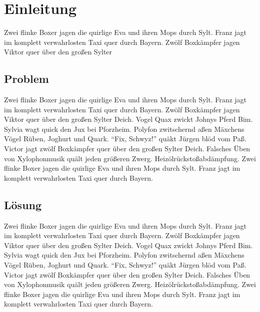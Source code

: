 \section{Einleitung}
Zwei flinke Boxer jagen die quirlige Eva und ihren Mops durch Sylt. Franz jagt im komplett verwahrlosten Taxi quer durch Bayern. Zwölf Boxkämpfer jagen Viktor quer über den großen Sylter

\subsection{Problem}
Zwei flinke Boxer jagen die quirlige Eva und ihren Mops durch Sylt. Franz jagt im komplett verwahrlosten Taxi quer durch Bayern. Zwölf Boxkämpfer jagen Viktor quer über den großen Sylter Deich. Vogel Quax zwickt Johnys Pferd Bim.\\
Sylvia wagt quick den Jux bei Pforzheim. Polyfon zwitschernd aßen Mäxchens Vögel Rüben, Joghurt und Quark. "`Fix, Schwyz!"' quäkt Jürgen blöd vom Paß. Victor jagt zwölf Boxkämpfer quer über den großen Sylter Deich. Falsches Üben von Xylophonmusik quält jeden größeren Zwerg. Heizölrückstoßabdämpfung. Zwei flinke Boxer jagen die quirlige Eva und ihren Mops durch Sylt. Franz jagt im komplett verwahrlosten Taxi quer durch Bayern.

\subsection{Lösung}
Zwei flinke Boxer jagen die quirlige Eva und ihren Mops durch Sylt. Franz jagt im komplett verwahrlosten Taxi quer durch Bayern. Zwölf Boxkämpfer jagen Viktor quer über den großen Sylter Deich. Vogel Quax zwickt Johnys Pferd Bim.\\
Sylvia wagt quick den Jux bei Pforzheim. Polyfon zwitschernd aßen Mäxchens Vögel Rüben, Joghurt und Quark. "`Fix, Schwyz!"' quäkt Jürgen blöd vom Paß. Victor jagt zwölf Boxkämpfer quer über den großen Sylter Deich. Falsches Üben von Xylophonmusik quält jeden größeren Zwerg. Heizölrückstoßabdämpfung. Zwei flinke Boxer jagen die quirlige Eva und ihren Mops durch Sylt. Franz jagt im komplett verwahrlosten Taxi quer durch Bayern.

\newpage